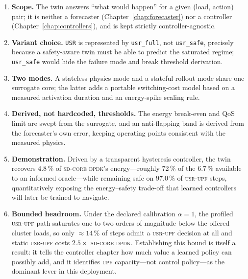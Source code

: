 \documentclass[12pt, a4paper]{report}
\newcommand{\dpdk}{\textsc{sd-core dpdk}}
\newcommand{\usr}{\textsc{usr-upf}}
\newcommand{\upf}{\textsc{upf}}
\newcommand{\code}[1]{\texttt{#1}}
\begin{document}
\begin{enumerate}
  \item \textbf{Scope.} The twin answers ``what would happen'' for a given
    (load, action) pair; it is neither a forecaster
    (Chapter~\ref{chap:forecaster}) nor a controller
    (Chapter~\ref{chap:controllers}), and is kept strictly controller-agnostic.
  \item \textbf{Variant choice.} \code{USR} is represented by \code{usr\_full},
    not \code{usr\_safe}, precisely because a safety-aware twin must be able to
    predict the saturated regime; \code{usr\_safe} would hide the failure mode
    and break threshold derivation.
  \item \textbf{Two modes.} A stateless physics mode and a stateful rollout
    mode share one surrogate core; the latter adds a portable switching-cost
    model based on a measured activation duration and an energy-spike scaling
    rule.
  \item \textbf{Derived, not hardcoded, thresholds.} The energy break-even and
    QoS limit are swept from the surrogate, and an anti-flapping band is
    derived from the forecaster's own error, keeping operating points
    consistent with the measured physics.
  \item \textbf{Demonstration.} Driven by a transparent hysteresis controller,
    the twin recovers 4.8\,\% of \dpdk{}'s energy---roughly 72\,\% of the
    6.7\,\% available to an informed oracle---while remaining safe on 97.0\,\%
    of \usr{} steps, quantitatively exposing the energy--safety trade-off that
    learned controllers will later be trained to navigate.
  \item \textbf{Bounded headroom.} Under the declared calibration
    $\alpha = 1$, the profiled \usr{} path saturates one to two orders of
    magnitude below the offered cluster loads, so only $\approx 14$\,\% of
    steps admit a \usr{} decision at all and static \usr{} costs $2.5\times$
    \dpdk{}. Establishing this bound is itself a result: it tells the
    controller chapter how much value a learned policy can possibly add, and
    it identifies \upf{} capacity---not control policy---as the dominant
    lever in this deployment.
\end{enumerate}
\end{document}
